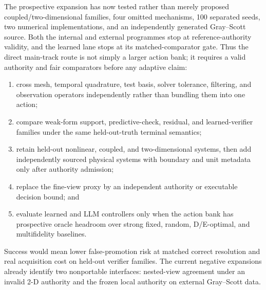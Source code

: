 \documentclass{article}
\begin{document}
The prospective expansion has now tested rather than merely proposed coupled/two-dimensional
families, four omitted mechanisms, 100 separated seeds, two numerical implementations, and an
independently generated Gray--Scott source. Both the internal and external programmes stop at
reference-authority validity, and the learned lane stops at its matched-comparator gate. Thus the
direct main-track route is not simply a larger action bank; it requires a valid authority and fair
comparators before any adaptive claim:
\begin{enumerate}[leftmargin=*,nosep]
  \item cross mesh, temporal quadrature, test basis, solver tolerance, filtering, and observation
  operators independently rather than bundling them into one action;
  \item compare weak-form support, predictive-check, residual, and learned-verifier families under
  the same held-out-truth terminal semantics;
  \item retain held-out nonlinear, coupled, and two-dimensional systems, then add independently
  sourced physical systems with boundary and unit metadata only after authority admission;
  \item replace the fine-view proxy by an independent authority or executable decision bound; and
  \item evaluate learned and LLM controllers only when the action bank has prospective oracle
  headroom over strong fixed, random, D/E-optimal, and multifidelity baselines.
\end{enumerate}
Success would mean lower false-promotion risk at matched correct resolution and real acquisition
cost on held-out verifier families. The current negative expansions already identify two
nonportable interfaces: nested-view agreement under an invalid 2-D authority and the frozen local
authority on external Gray--Scott data.
\end{document}
